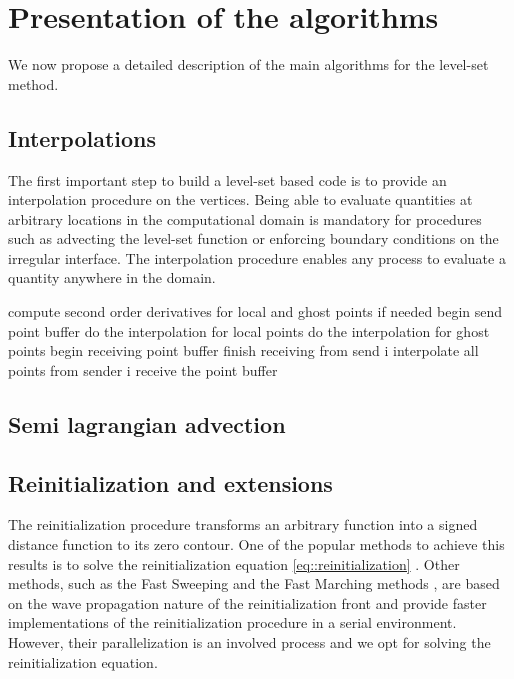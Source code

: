 \section{Presentation of the algorithms}

We now propose a detailed description of the main algorithms for the level-set method.

\subsection{Interpolations}

The first important step to build a level-set based code is to provide an interpolation procedure on the vertices. Being able to evaluate quantities at arbitrary locations in the computational domain is mandatory for procedures such as advecting the level-set function or enforcing boundary conditions on the irregular interface. The interpolation procedure enables any process to evaluate a quantity anywhere in the domain.

\begin{algorithm}[ht!]
\begin{algorithmic}
	\State compute second order derivatives for local and ghost points if needed
\EndIf
\State begin send point buffer
\State do the interpolation for local points
\State do the interpolation for ghost points
\State begin receiving point buffer
	\State finish receiving from send i
	\State interpolate all points from sender i
\EndFor
\State receive the point buffer
\end{algorithmic}
\end{algorithm}

\subsection{Semi lagrangian advection}

\subsection{Reinitialization and extensions} \label{section::reinitialization}

The reinitialization procedure transforms an arbitrary function into a signed distance function to its zero contour. One of the popular methods to achieve this results is to solve the reinitialization equation \ref{eq::reinitialization} \cite{Sussman;Smereka;Osher:94:A-Level-Set-Approach, Min;Gibou:07:A-second-order-accur}. Other methods, such as the Fast Sweeping \cite{Zhao:04:A-Fast-Sweeping-Meth} and the Fast Marching methods \cite{Sethian:96:A-Fast-Marching-Leve, Chopp:01:Some-improvements-of}, are based on the wave propagation nature of the reinitialization front and provide faster implementations of the reinitialization procedure in a serial environment. However, their parallelization is an involved process and we opt for solving the reinitialization equation.

